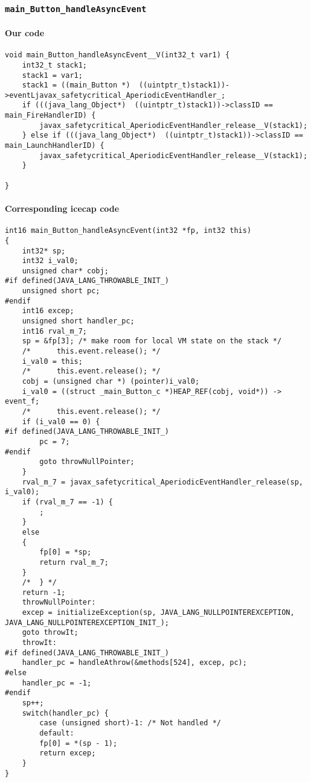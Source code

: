\subsubsection{\texttt{main\_Button\_handleAsyncEvent}}

\paragraph{Our code}\hfill
\begin{lstlisting}[firstnumber=1765]
void main_Button_handleAsyncEvent__V(int32_t var1) {
	int32_t stack1;
	stack1 = var1;
	stack1 = ((main_Button *)  ((uintptr_t)stack1))->eventLjavax_safetycritical_AperiodicEventHandler_;
	if (((java_lang_Object*)  ((uintptr_t)stack1))->classID == main_FireHandlerID) {
		javax_safetycritical_AperiodicEventHandler_release__V(stack1);
	} else if (((java_lang_Object*)  ((uintptr_t)stack1))->classID == main_LaunchHandlerID) {
		javax_safetycritical_AperiodicEventHandler_release__V(stack1);
	}

}
\end{lstlisting}

\paragraph{Corresponding icecap code}\hfill
\begin{lstlisting}[firstnumber=54834]
int16 main_Button_handleAsyncEvent(int32 *fp, int32 this)
{
	int32* sp;
	int32 i_val0;
	unsigned char* cobj;
#if defined(JAVA_LANG_THROWABLE_INIT_)
	unsigned short pc;
#endif
	int16 excep;
	unsigned short handler_pc;
	int16 rval_m_7;
	sp = &fp[3]; /* make room for local VM state on the stack */
	/*		this.event.release(); */
	i_val0 = this;
	/*		this.event.release(); */
	cobj = (unsigned char *) (pointer)i_val0;
	i_val0 = ((struct _main_Button_c *)HEAP_REF(cobj, void*)) -> event_f;
	/*		this.event.release(); */
	if (i_val0 == 0) {
#if defined(JAVA_LANG_THROWABLE_INIT_)
		pc = 7;
#endif
		goto throwNullPointer;
	}
	rval_m_7 = javax_safetycritical_AperiodicEventHandler_release(sp, i_val0);
	if (rval_m_7 == -1) {
		;
	}
	else
	{
		fp[0] = *sp;
		return rval_m_7;
	}
	/*	} */
	return -1;
	throwNullPointer:
	excep = initializeException(sp, JAVA_LANG_NULLPOINTEREXCEPTION, JAVA_LANG_NULLPOINTEREXCEPTION_INIT_);
	goto throwIt;
	throwIt:
#if defined(JAVA_LANG_THROWABLE_INIT_)
	handler_pc = handleAthrow(&methods[524], excep, pc);
#else
	handler_pc = -1;
#endif
	sp++;
	switch(handler_pc) {
		case (unsigned short)-1: /* Not handled */
		default:
		fp[0] = *(sp - 1);
		return excep;
	}
}
\end{lstlisting}


